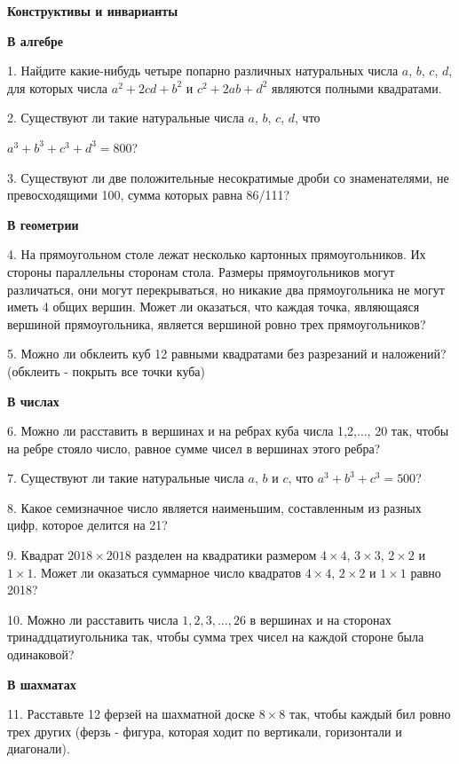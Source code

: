 \centerline{\bf \Huge Конструктивы и инварианты}

\centerline{\bf \Huge В алгебре}

1. Найдите какие-нибудь четыре попарно различных натуральных числа $a$, $b$, $c$, $d$, для которых числа  $a^2 + 2cd + b^2$  и  $c^2 + 2ab + d^2$  являются полными квадратами.

2. Существуют ли такие натуральные числа $a$, $b$, $c$, $d$, что 

$a^3+b^3+c^3+d^3=800$?


3. Существуют ли две положительные несократимые дроби со знаменателями, не превосходящими 100, сумма которых равна 86/111?

\centerline{\bf \Huge В геометрии}

4. На прямоугольном столе лежат несколько картонных прямоугольников. Их стороны параллельны сторонам стола. Размеры прямоугольников могут различаться, они могут перекрываться, но никакие два прямоугольника не могут иметь 4 общих вершин. Может ли оказаться, что каждая точка, являющаяся вершиной прямоугольника, является вершиной ровно трех прямоугольников?

5. Можно ли обклеить куб 12 равными квадратами без разрезаний и наложений? (обклеить - покрыть все точки куба)



\centerline{\bf \Huge В числах}

6. Можно ли расставить в вершинах и на ребрах куба числа 1,2,$\ldots$, 20 так, чтобы на ребре стояло число, равное сумме чисел в вершинах этого ребра?

7. Существуют ли такие натуральные числа $a$, $b$ и $c$, что $a^3+b^3+c^3 = 500$?

8. Какое семизначное число является наименьшим, составленным из разных цифр, которое делится на 21?

9. Квадрат $2018 \times 2018$ разделен на квадратики размером $4\times4$, $3\times3$, $2\times2$ и $1\times1$. Может ли оказаться суммарное число квадратов $4\times4$, $2\times2$ и $1\times1$ равно 2018?

10. Можно ли расставить числа $1,2,3, \ldots, 26$ в вершинах и на сторонах тринаддцатиугольника так, чтобы сумма трех чисел на каждой стороне была одинаковой?

\centerline{\bf \Huge В шахматах}


11. Расставьте 12 ферзей на шахматной доске $8\times8$ так, чтобы каждый бил ровно трех других (ферзь - фигура, которая ходит по вертикали, горизонтали и диагонали).

